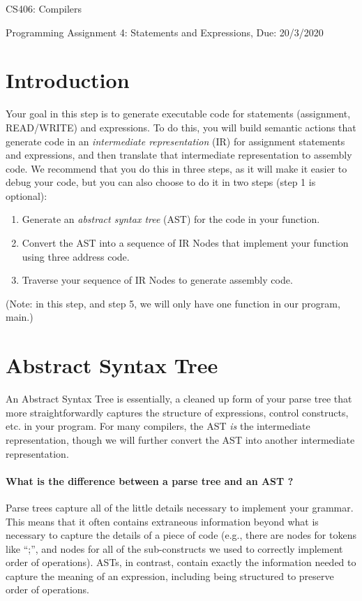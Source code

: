 \documentclass{article}
\begin{document}
\begin{center}{\LARGE CS406: Compilers} \end{center}
\begin{center}{\large Programming Assignment 4: Statements and Expressions,  Due: 20/3/2020} \end{center}

\bigskip



\section{Introduction}
Your goal in this step is to generate executable code for statements (assignment, READ/WRITE) and expressions.
To do this, you will build semantic actions that generate code in an {\em intermediate representation} (IR) for assignment statements and expressions, and then translate that intermediate representation to assembly code.
We recommend that you do this in three steps, as it will make it easier to debug your code, but you can also choose to do it in two steps (step 1 is optional):
\begin{enumerate}
	\item Generate an {\em abstract syntax tree} (AST) for the code in your function.
	\item Convert the AST into a sequence of IR Nodes that implement your function using three address code.
	\item Traverse your sequence of IR Nodes to generate assembly code.
\end{enumerate}

(Note: in this step, and step 5, we will only have one function in our program, main.)

\section{Abstract Syntax Tree}
An Abstract Syntax Tree is essentially, a cleaned up form of your parse tree that more straightforwardly captures the structure of expressions, control constructs, etc. in your program. For many compilers, the AST {\em is} the intermediate representation, though we will further convert the AST into another intermediate representation.

\paragraph{What is the difference between a parse tree and an AST ?}
Parse trees capture all of the little details necessary to implement your grammar. This means that it often contains extraneous information beyond what is necessary to capture the details of a piece of code (e.g., there are nodes for tokens like ``;'', and nodes for all of the sub-constructs we used to correctly implement order of operations). ASTs, in contrast, contain exactly the information needed to capture the meaning of an expression, including being structured to preserve order of operations.
\end{document}

